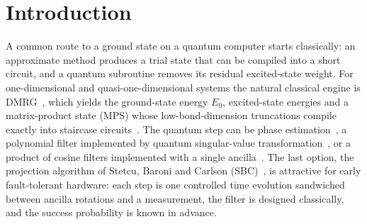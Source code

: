 \documentclass[aps,pra,twocolumn,superscriptaddress,nofootinbib]{revtex4-2}
\begin{document}
\section{Introduction}

A common route to a ground state on a quantum computer starts classically: an approximate method
produces a trial state that can be compiled into a short circuit, and a quantum subroutine removes its
residual excited-state weight. For one-dimensional and quasi-one-dimensional systems the natural
classical engine is DMRG~\cite{White1992,Schollwock2011}, which yields the ground-state energy $E_0$,
excited-state energies and a matrix-product state (MPS) whose low-bond-dimension truncations compile
exactly into staircase circuits~\cite{Ran2020}. The quantum step can be phase estimation~\cite{Ge2019},
a polynomial filter implemented by quantum singular-value
transformation~\cite{Lin2020,Gilyen2019,Dong2022}, or a product of cosine filters implemented with a
single ancilla~\cite{Stetcu2023,Choi2021}. The last option, the projection algorithm of Stetcu, Baroni
and Carlson (SBC)~\cite{Stetcu2023}, is attractive for early fault-tolerant hardware: each step is one
controlled time evolution sandwiched between ancilla rotations and a measurement, the filter is
designed classically, and the success probability is known in advance.
\end{document}
